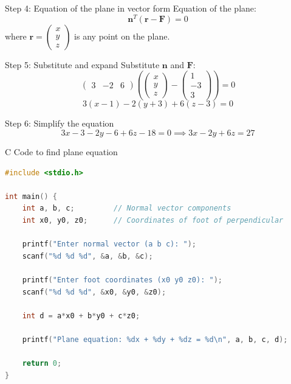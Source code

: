 \documentclass{beamer}
\begin{document}
\begin{frame}{Step 4: Equation of the plane in vector form}
    Equation of the plane:
    \[
    \mathbf{n}^T (\mathbf{r} - \mathbf{F}) = 0
    \]
    where \(\mathbf{r} = \begin{pmatrix} x \\ y \\ z \end{pmatrix}\) is any point on the plane.
\end{frame}

\begin{frame}{Step 5: Substitute and expand}
    Substitute \(\mathbf{n}\) and \(\mathbf{F}\):
    \[
    \begin{pmatrix} 3 & -2 & 6 \end{pmatrix} \left( \begin{pmatrix} x \\ y \\ z \end{pmatrix} - \begin{pmatrix} 1 \\ -3 \\ 3 \end{pmatrix} \right) = 0
    \]
    \[
    3(x-1) - 2(y+3) + 6(z-3) = 0
    \]
\end{frame}

\begin{frame}{Step 6: Simplify the equation}
    \[
    3x - 3 - 2y - 6 + 6z - 18 = 0 \implies 3x - 2y + 6z = 27
    \]
\end{frame}

\begin{frame}[fragile]{C Code to find plane equation}
\begin{lstlisting}[language=C]
#include <stdio.h>

int main() {
    int a, b, c;         // Normal vector components
    int x0, y0, z0;      // Coordinates of foot of perpendicular

    printf("Enter normal vector (a b c): ");
    scanf("%d %d %d", &a, &b, &c);

    printf("Enter foot coordinates (x0 y0 z0): ");
    scanf("%d %d %d", &x0, &y0, &z0);

    int d = a*x0 + b*y0 + c*z0;

    printf("Plane equation: %dx + %dy + %dz = %d\n", a, b, c, d);

    return 0;
}
\end{lstlisting}
\end{frame}
\end{document}
